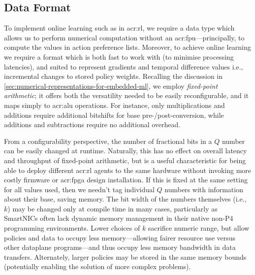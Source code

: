 \subsection{Data Format}\label{sec:opal-data-format}
To implement online learning such as in \gls{acr:rl}, we require a data type which allows us to perform numerical computation without an \gls{acr:fpu}---principally, to compute the values in action preference lists.
Moreover, to achieve online learning we require a format which is both fast to work with (to minimise processing latencies), and suited to represent gradients and temporal difference values i.e., incremental changes to stored policy weights.
Recalling the discussion in \cref{sec:numerical-representations-for-embedded-ml}, we employ \emph{fixed-point arithmetic}; it offers both the versatility needed to be easily reconfigurable, and it maps simply to \gls{acr:alu} operations.
For instance, only multiplications and additions require additional bitshifts for base pre-/post-conversion, while additions and subtractions require no additional overhead.


From a configurability perspective, the number of fractional bits in a $Q$ number can be easily changed at runtime.
Naturally, this has no effect on overall latency and throughput of fixed-point arithmetic, but is a useful characteristic for being able to deploy different \gls{acr:rl} agents to the same hardware without invoking more costly firmware or \gls{acr:fpga} design installation.
If this is fixed at the same setting for all values used, then we needn't tag individual $Q$ numbers with information about their base, saving memory.
The bit width of the numbers themselves (i.e., $k$) may be changed only at compile time in many cases, particularly as SmartNICs often lack dynamic memory management in their native non-P4 programming environments.
Lower choices of $k$ sacrifice numeric range, but allow policies and data to occupy less memory---allowing fairer resource use versus other dataplane programs---and thus occupy less memory bandwidth in data transfers.
Alternately, larger policies may be stored in the same memory bounds (potentially enabling the solution of more complex problems).


